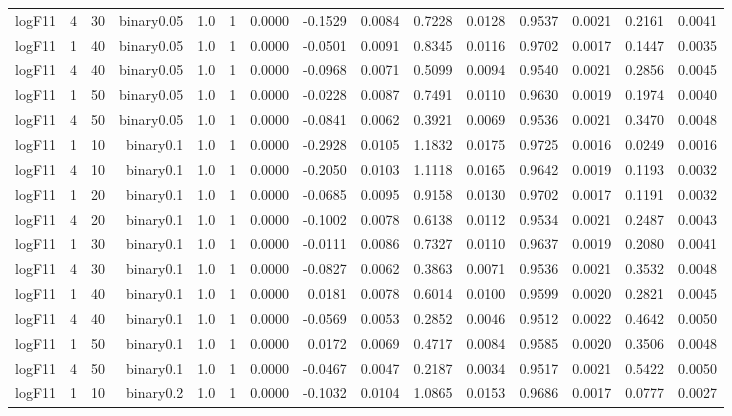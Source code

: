 \begin{longtable}{rrrrrrrrrrrrrrr}
  logF11 & 4 & 30 & binary0.05 & 1.0 & 1 & 0.0000 & -0.1529 & 0.0084 & 0.7228 & 0.0128 & 0.9537 & 0.0021 & 0.2161 & 0.0041 \\ 
  logF11 & 1 & 40 & binary0.05 & 1.0 & 1 & 0.0000 & -0.0501 & 0.0091 & 0.8345 & 0.0116 & 0.9702 & 0.0017 & 0.1447 & 0.0035 \\ 
  logF11 & 4 & 40 & binary0.05 & 1.0 & 1 & 0.0000 & -0.0968 & 0.0071 & 0.5099 & 0.0094 & 0.9540 & 0.0021 & 0.2856 & 0.0045 \\ 
  logF11 & 1 & 50 & binary0.05 & 1.0 & 1 & 0.0000 & -0.0228 & 0.0087 & 0.7491 & 0.0110 & 0.9630 & 0.0019 & 0.1974 & 0.0040 \\ 
  logF11 & 4 & 50 & binary0.05 & 1.0 & 1 & 0.0000 & -0.0841 & 0.0062 & 0.3921 & 0.0069 & 0.9536 & 0.0021 & 0.3470 & 0.0048 \\ 
  logF11 & 1 & 10 & binary0.1 & 1.0 & 1 & 0.0000 & -0.2928 & 0.0105 & 1.1832 & 0.0175 & 0.9725 & 0.0016 & 0.0249 & 0.0016 \\ 
  logF11 & 4 & 10 & binary0.1 & 1.0 & 1 & 0.0000 & -0.2050 & 0.0103 & 1.1118 & 0.0165 & 0.9642 & 0.0019 & 0.1193 & 0.0032 \\ 
  logF11 & 1 & 20 & binary0.1 & 1.0 & 1 & 0.0000 & -0.0685 & 0.0095 & 0.9158 & 0.0130 & 0.9702 & 0.0017 & 0.1191 & 0.0032 \\ 
  logF11 & 4 & 20 & binary0.1 & 1.0 & 1 & 0.0000 & -0.1002 & 0.0078 & 0.6138 & 0.0112 & 0.9534 & 0.0021 & 0.2487 & 0.0043 \\ 
  logF11 & 1 & 30 & binary0.1 & 1.0 & 1 & 0.0000 & -0.0111 & 0.0086 & 0.7327 & 0.0110 & 0.9637 & 0.0019 & 0.2080 & 0.0041 \\ 
  logF11 & 4 & 30 & binary0.1 & 1.0 & 1 & 0.0000 & -0.0827 & 0.0062 & 0.3863 & 0.0071 & 0.9536 & 0.0021 & 0.3532 & 0.0048 \\ 
  logF11 & 1 & 40 & binary0.1 & 1.0 & 1 & 0.0000 & 0.0181 & 0.0078 & 0.6014 & 0.0100 & 0.9599 & 0.0020 & 0.2821 & 0.0045 \\ 
  logF11 & 4 & 40 & binary0.1 & 1.0 & 1 & 0.0000 & -0.0569 & 0.0053 & 0.2852 & 0.0046 & 0.9512 & 0.0022 & 0.4642 & 0.0050 \\ 
  logF11 & 1 & 50 & binary0.1 & 1.0 & 1 & 0.0000 & 0.0172 & 0.0069 & 0.4717 & 0.0084 & 0.9585 & 0.0020 & 0.3506 & 0.0048 \\ 
  logF11 & 4 & 50 & binary0.1 & 1.0 & 1 & 0.0000 & -0.0467 & 0.0047 & 0.2187 & 0.0034 & 0.9517 & 0.0021 & 0.5422 & 0.0050 \\ 
  logF11 & 1 & 10 & binary0.2 & 1.0 & 1 & 0.0000 & -0.1032 & 0.0104 & 1.0865 & 0.0153 & 0.9686 & 0.0017 & 0.0777 & 0.0027 \\ 

\end{longtable}
